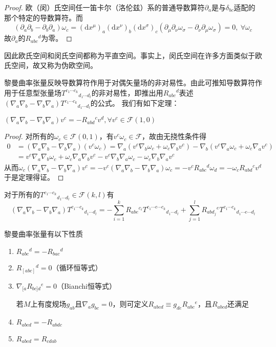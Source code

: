 \begin{proof}
欧（闵）氏空间任一笛卡尔（洛伦兹）系的普通导数算符$\partial_a$是与$\delta_{bc}$适配的那个特定的导数算符。而
$$(\partial_a\partial_b - \partial_b\partial_a)\omega_c = (\mathrm{d}x^\mu)_a(\mathrm{d}x^\nu)_b(\mathrm{d}x^\sigma)_c(\partial_\mu\partial_\nu\omega_\sigma - \partial_\nu\partial_\mu\omega_\sigma) = 0, ~ \forall \omega_c$$
故$\partial_a$的$R_{abc}{}^d$为零。
\end{proof}

因此欧氏空间和闵氏空间都称为平直空间。事实上，闵氏空间在许多方面类似于欧氏空间，故又称为伪欧空间。

黎曼曲率张量反映导数算符作用于对偶矢量场的非对易性。由此可推知导数算符作用于任意型张量场$T^{c_1 \cdots c_k}{}_{d_1 \cdots d_l}$的非对易性，即推出用$R_{abc}{}^d$表述$(\nabla_a\nabla_b - \nabla_b\nabla_a)T^{c_1 \cdots c_k}{}_{d_1 \cdots d_l}$的公式。
我们有如下定理：

\begin{theorem}
$(\nabla_a\nabla_b - \nabla_b\nabla_a)v^c = -R_{abd}{}^cv^d, \forall v^c \in \mathscr{F}(1, 0)$
\end{theorem}

\begin{proof}
对所有的$\omega_c \in \mathscr{F}(0, 1)$，有$v^c\omega_c \in \mathscr{F}$，故由无挠性条件得
$$\begin{aligned}
0 & = (\nabla_a\nabla_b - \nabla_b\nabla_a)(v^c\omega_c) = \nabla_a(v^c\nabla_b\omega_c + \omega_c\nabla_bv^c) - \nabla_b(v^c\nabla_a\omega_c + \omega_c\nabla_av^c) \\
& = v^c\nabla_a\nabla_b\omega_c + \omega_c\nabla_a\nabla_bv^c - v^c\nabla_b\nabla_a\omega_c - \omega_c\nabla_b\nabla_av^c
\end{aligned}$$
从而$\omega_c(\nabla_a\nabla_b - \nabla_b\nabla_a)v^c = -v^c(\nabla_a\nabla_b - \nabla_b\nabla_a)\omega_c = -v^cR_{abc}{}^d\omega_d = -\omega_cR_{abd}{}^cv^d$
于是定理得证。
\end{proof}

\begin{theorem}
对于所有的$T^{c_1 \cdots c_k}{}_{d_1 \cdots d_l} \in \mathscr{F}(k, l)$有
$$(\nabla_a\nabla_b - \nabla_b\nabla_a)T^{c_1 \cdots c_k}{}_{d_1 \cdots d_l} = -\sum^k_{i = 1}R_{abe}{}^{c_i}T^{c_1 \cdots e \cdots c_k}{}_{d_1 \cdots d_l} + \sum^l_{j = 1}R_{abd_j}{}^eT^{c_1 \cdots c_k}{}_{d_1 \cdots e \cdots d_l}$$
\end{theorem}

\begin{theorem}
黎曼曲率张量有以下性质
\begin{enumerate}[（1）]
\item $R_{abc}{}^d = -R_{bac}{}^d$
\item $R_{[abc]}{}^d = 0$（循环恒等式）
\item $\nabla_{[a}R_{bc]d}{}^e = 0$（Bianchi恒等式）

若$M$上有度规场$g_{ab}$且$\nabla_ag_{bc} = 0$，则可定义$R_{abcd} \equiv g_{de}R_{abc}{}^e$，且$R_{abcd}$还满足

\item $R_{abcd} = -R_{abdc}$
\item $R_{abcd} = R_{cdab}$
\end{enumerate}
\end{theorem}

